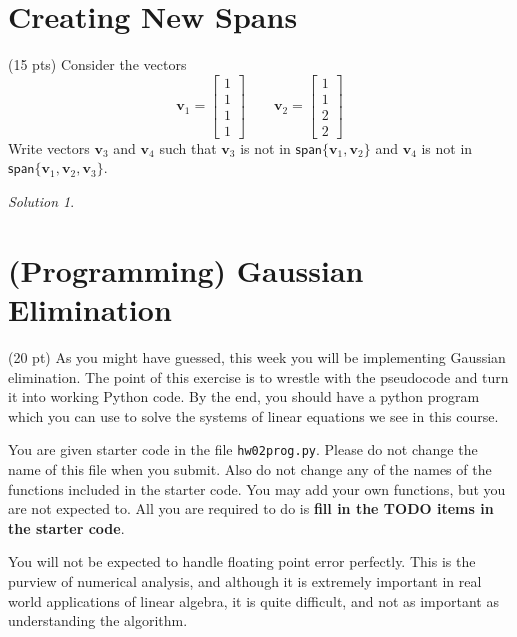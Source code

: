\documentclass{article}
\theoremstyle{remark}
\newtheorem*{solution}{Solution}
\begin{document}
\pagebreak
\section{Creating New Spans}
(15 pts) Consider the vectors
\begin{displaymath}
  \mathbf v_1 =
  \begin{bmatrix}
    1 \\ 1 \\ 1 \\ 1
  \end{bmatrix}
  \qquad
  \mathbf v_2 =
  \begin{bmatrix}
    1 \\ 1 \\ 2 \\ 2
  \end{bmatrix}
\end{displaymath}
Write vectors $\mathbf v_3$ and $\mathbf v_4$ such that $\mathbf v_3$ is not in $\mathsf{span}\{\mathbf v_1, \mathbf v_2\}$ and $\mathbf v_4$ is not in $\mathsf{span}\{\mathbf v_1, \mathbf v_2, \mathbf v_3\}$.

\begin{solution}
\end{solution}

\pagebreak
\section{(Programming) Gaussian Elimination}

(20 pt) As you might have guessed, this week you will be implementing Gaussian elimination.
The point of this exercise is to wrestle with the pseudocode and turn it into working Python code.
By the end, you should have a python program which you can use to solve the systems of linear equations we see in this course.

You are given starter code in the file \texttt{hw02prog.py}.
Please do not change the name of this file when you submit.
Also do not change any of the names of the functions included in the starter code.
You may add your own functions, but you are not expected to.
All you are required to do is \textbf{fill in the TODO items in the starter code}.

You will not be expected to handle floating point error perfectly.
This is the purview of numerical analysis, and although it is extremely important in real world applications of linear algebra, it is quite difficult, and not as important as understanding the algorithm.
\end{document}
